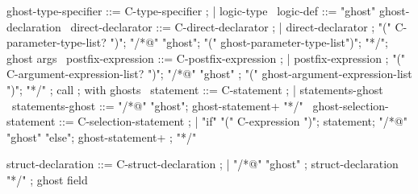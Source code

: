 \begin{syntax}

  ghost-type-specifier ::= C-type-specifier ;
  | {logic-type} \
  logic-def ::= "ghost" ghost-declaration \
  direct-declarator ::= C-direct-declarator ;
    | direct-declarator ;
    "(" C-parameter-type-list? ")";
        {"/*@" "ghost"};
          {"(" ghost-parameter-type-list")"};
          {"*/"}; ghost args
        \
  postfix-expression ::= C-postfix-expression ;
    | postfix-expression ;
     "(" C-argument-expression-list? ")";
     {"/*@" "ghost"} ;
     {  "(" ghost-argument-expression-list ")"};
     {  "*/"} ; call
              ; with ghosts
    \
  statement ::= C-statement ;
             | statements-ghost \
  statements-ghost ::= "/*@" "ghost";
                       ghost-statement+ "*/" \
  ghost-selection-statement ::= C-selection-statement ;
    | "if" "(" C-expression ")";
       statement;
      {"/*@" "ghost" "else"};
      {  ghost-statement+ };
      {  "*/"} \

  struct-declaration ::= C-struct-declaration ;
  | {"/*@" "ghost" };
    { struct-declaration "*/"} ; ghost field

\end{syntax}

